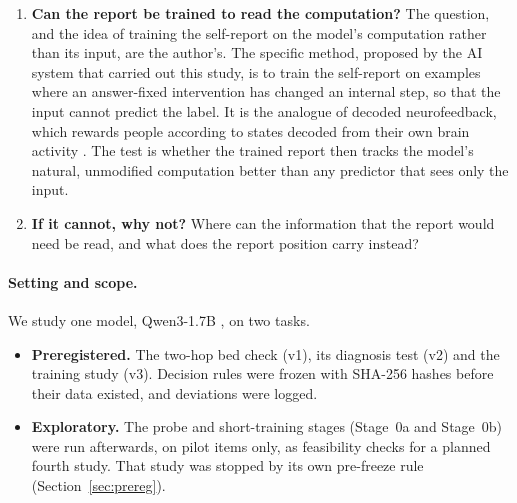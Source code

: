 \documentclass[11pt]{article}
\begin{document}
\begin{enumerate}
\item \textbf{Can the report be trained to read the computation?} The question, and the idea of training the self-report on the model's computation rather than its input, are the author's. The specific method, proposed by the AI system that carried out this study, is to train the self-report on examples where an answer-fixed intervention has changed an internal step, so that the input cannot predict the label. It is the analogue of decoded neurofeedback, which rewards people according to states decoded from their own brain activity \citep{shibata2011perceptual,cortese2016multivoxel}. The test is whether the trained report then tracks the model's natural, unmodified computation better than any predictor that sees only the input.
\item \textbf{If it cannot, why not?} Where can the information that the report would need be read, and what does the report position carry instead?
\end{enumerate}

\paragraph{Setting and scope.} We study one model, Qwen3-1.7B \citep{yang2025qwen3}, on two tasks.
\begin{itemize}
\item \textbf{Preregistered.} The two-hop bed check (v1), its diagnosis test (v2) and the training study (v3). Decision rules were frozen with SHA-256 hashes before their data existed, and deviations were logged.
\item \textbf{Exploratory.} The probe and short-training stages (Stage~0a and Stage~0b) were run afterwards, on pilot items only, as feasibility checks for a planned fourth study. That study was stopped by its own pre-freeze rule (Section~\ref{sec:prereg}).
\end{itemize}
\end{document}
